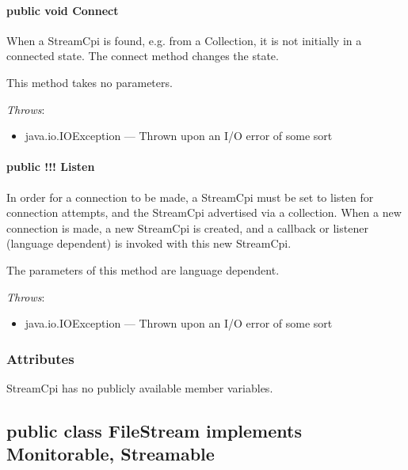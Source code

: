\documentclass[$Date: 2003/06/26 19:29:31 $]{glabarticle}
\begin{document}
\paragraph{public void Connect}

When a StreamCpi is found, e.g. from a Collection, it is not initially in
a connected state.  The connect method changes the state.

This method takes no parameters.

\textit{Throws}:
\begin{itemize}
\item[] java.io.IOException --- Thrown upon an I/O error of some sort 
\end{itemize}

\paragraph{public !!! Listen}

In order for a connection to be made, a StreamCpi must be set to listen
for connection attempts, and the StreamCpi advertised via a collection.
When a new connection is made, a new StreamCpi is created, and a callback
or listener (language dependent) is invoked with this new StreamCpi.

The parameters of this method are language dependent.


\textit{Throws}:
\begin{itemize}
\item[] java.io.IOException --- Thrown upon an I/O error of some sort 
\end{itemize}


\subsubsection{Attributes}

StreamCpi has no publicly available member variables. 


\newpage

\subsection{public class FileStream implements Monitorable, Streamable}
\end{document}
